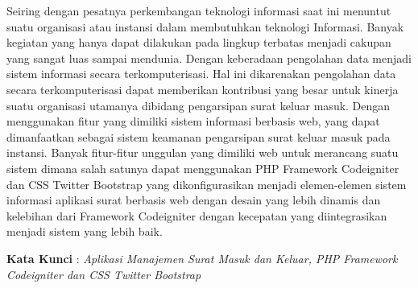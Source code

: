 \documentclass{jtetiproposalskripsi}
\begin{document}
\cover
 
\approvalpage


\begin{abstractind}
Seiring dengan pesatnya perkembangan teknologi informasi saat ini menuntut suatu organisasi atau instansi dalam membutuhkan teknologi Informasi. Banyak kegiatan yang hanya dapat dilakukan pada lingkup terbatas menjadi cakupan yang sangat luas sampai mendunia. Dengan keberadaan pengolahan data menjadi sistem informasi secara terkomputerisasi. Hal ini dikarenakan pengolahan data secara terkomputerisasi dapat memberikan kontribusi yang besar untuk kinerja suatu organisasi utamanya dibidang pengarsipan surat keluar masuk.
Dengan menggunakan fitur yang dimiliki sistem informasi berbasis web, yang dapat dimanfaatkan sebagai sistem keamanan pengarsipan surat keluar masuk pada instansi. Banyak fitur-fitur unggulan yang dimiliki web untuk merancang suatu sistem dimana salah satunya dapat menggunakan PHP Framework Codeigniter dan CSS Twitter Bootstrap yang dikonfigurasikan menjadi elemen-elemen sistem informasi aplikasi surat berbasis web dengan desain yang lebih dinamis dan kelebihan dari Framework Codeigniter dengan kecepatan yang diintegrasikan menjadi sistem yang lebih baik.

\begin{flushleft}

\textbf{Kata Kunci} : \textit{Aplikasi Manajemen Surat Masuk dan Keluar, PHP Framework Codeigniter dan CSS Twitter Bootstrap}
\end{flushleft}

\bigskip

\end{abstractind}

\tableofcontents
{}
\clearpage{}\setcounter{page}{1}

\end{document}
